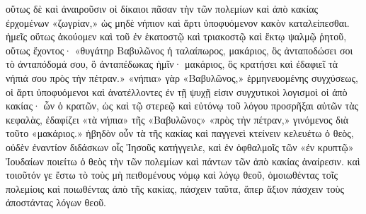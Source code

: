 οὕτως δὲ καὶ ἀναιροῦσιν οἱ δίκαιοι πᾶσαν τὴν τῶν πολεμίων καὶ ἀπὸ κακίας ἐρχομένων «ζωγρίαν,» ὡς μηδὲ νήπιον καὶ ἄρτι ὑποφυόμενον κακὸν καταλείπεσθαι. ἡμεῖς οὕτως ἀκούομεν καὶ τοῦ ἐν ἑκατοστῷ καὶ τριακοστῷ καὶ ἕκτῳ ψαλμῷ ῥητοῦ, οὕτως ἔχοντος· «θυγάτηρ Βαβυλῶνος ἡ ταλαίπωρος, μακάριος, ὃς ἀνταποδώσει σοι τὸ ἀνταπόδομά σου, ὃ ἀνταπέδωκας ἡμῖν· μακάριος, ὃς κρατήσει καὶ ἐδαφιεῖ τὰ νήπιά σου πρὸς τὴν πέτραν.» «νήπια» γὰρ «Βαβυλῶνος,» ἑρμηνευομένης συγχύσεως, οἱ ἄρτι ὑποφυόμενοι καὶ ἀνατέλλοντες ἐν τῇ ψυχῇ εἰσιν συγχυτικοὶ λογισμοὶ οἱ ἀπὸ κακίας· ὧν ὁ κρατῶν, ὡς καὶ τῷ στερεῷ καὶ εὐτόνῳ τοῦ λόγου προσρῆξαι αὐτῶν τὰς κεφαλὰς, ἐδαφίζει «τὰ νήπια» τῆς «Βαβυλῶνος» «πρὸς τὴν πέτραν,» γινόμενος διὰ τοῦτο «μακάριος.» ἡβηδὸν οὖν τὰ τῆς κακίας καὶ παγγενεὶ κτείνειν κελευέτω ὁ θεὸς, οὐδὲν ἐναντίον διδάσκων οἷς Ἰησοῦς κατήγγειλε, καὶ ἐν ὀφθαλμοῖς τῶν «ἐν κρυπτῷ» Ἰουδαίων ποιείτω ὁ θεὸς τὴν τῶν πολεμίων καὶ πάντων τῶν ἀπὸ κακίας ἀναίρεσιν. καὶ τοιοῦτόν γε ἔστω τὸ τοὺς μὴ πειθομένους νόμῳ καὶ λόγῳ θεοῦ, ὁμοιωθέντας τοῖς πολεμίοις καὶ ποιωθέντας ἀπὸ τῆς κακίας, πάσχειν ταῦτα, ἅπερ ἄξιον πάσχειν τοὺς ἀποστάντας λόγων θεοῦ.